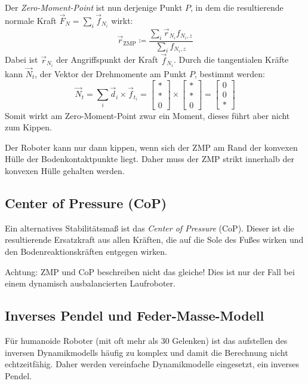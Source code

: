 			Der \emph{Zero-Moment-Point} ist nun derjenige Punkt \(P\), in dem die resultierende normale Kraft \( \vec{F}_N = \sum_i \vec{f}_{N_i} \) wirkt:
			\begin{equation*}
				\vec{r}_\text{ZMP} \coloneqq \frac{\sum_i \vec{r}_{N_i} f_{N_i, z}}{\sum_i f_{N_i, z}}
			\end{equation*}
			Dabei ist \( \vec{r}_{N_i} \) der Angriffspunkt der Kraft \( \vec{f}_{N_i} \). Durch die tangentialen Kräfte kann \( \vec{N}_t \), der Vektor der Drehmomente am Punkt \(P\), bestimmt werden:
			\begin{equation*}
				\vec{N}_t = \sum_i \vec{d}_i \times \vec{f}_{t_i} =
					\begin{bmatrix}
						\ast \\
						\ast \\
						0
					\end{bmatrix}
				\times
					\begin{bmatrix}
						\ast \\
						\ast \\
						0
					\end{bmatrix}
				=
					\begin{bmatrix}
						0 \\
						0 \\
						\ast
					\end{bmatrix}
			\end{equation*}
			Somit wirkt am Zero-Moment-Point zwar ein Moment, dieses führt aber nicht zum Kippen.
			
			Der Roboter kann nur dann kippen, wenn sich der ZMP am Rand der konvexen Hülle der Bodenkontaktpunkte liegt. Daher muss der ZMP strikt innerhalb der konvexen Hülle gehalten werden.

		\subsection{Center of Pressure (CoP)}
			Ein alternatives Stabilitätsmaß ist das \emph{Center of Pressure} (CoP). Dieser ist die resultierende Ersatzkraft aus allen Kräften, die auf die Sole des Fußes wirken und den Bodenreaktionskräften entgegen wirken.
			
			Achtung: ZMP und CoP beschreiben nicht das gleiche! Dies ist nur der Fall bei einem dynamisch ausbalancierten Laufroboter.

		\subsection{Inverses Pendel und Feder-Masse-Modell}
			Für humanoide Roboter (mit oft mehr als \num{30} Gelenken) ist das aufstellen des inversen Dynamikmodells häufig zu komplex und damit die Berechnung nicht echtzeitfähig. Daher werden vereinfache Dynamikmodelle eingesetzt, \zB ein inverses Pendel.
			
